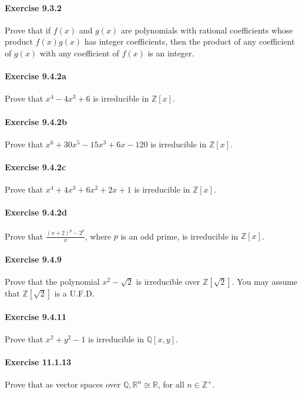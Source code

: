 \documentclass{article}
\theoremstyle{definition}
\begin{document}
\paragraph{Exercise 9.3.2} Prove that if $f(x)$ and $g(x)$ are polynomials with rational coefficients whose product $f(x) g(x)$ has integer coefficients, then the product of any coefficient of $g(x)$ with any coefficient of $f(x)$ is an integer.

\paragraph{Exercise 9.4.2a} Prove that $x^4-4x^3+6$ is irreducible in $\mathbb{Z}[x]$.

\paragraph{Exercise 9.4.2b} Prove that $x^6+30x^5-15x^3 + 6x-120$ is irreducible in $\mathbb{Z}[x]$.

\paragraph{Exercise 9.4.2c} Prove that $x^4+4x^3+6x^2+2x+1$ is irreducible in $\mathbb{Z}[x]$.

\paragraph{Exercise 9.4.2d} Prove that $\frac{(x+2)^p-2^p}{x}$, where $p$ is an odd prime, is irreducible in $\mathbb{Z}[x]$.

\paragraph{Exercise 9.4.9} Prove that the polynomial $x^{2}-\sqrt{2}$ is irreducible over $\mathbb{Z}[\sqrt{2}]$. You may assume that $\mathbb{Z}[\sqrt{2}]$ is a U.F.D.

\paragraph{Exercise 9.4.11} Prove that $x^2+y^2-1$ is irreducible in $\mathbb{Q}[x,y]$.

\paragraph{Exercise 11.1.13} Prove that as vector spaces over $\mathbb{Q}, \mathbb{R}^n \cong \mathbb{R}$, for all $n \in \mathbb{Z}^{+}$.
\end{document}
